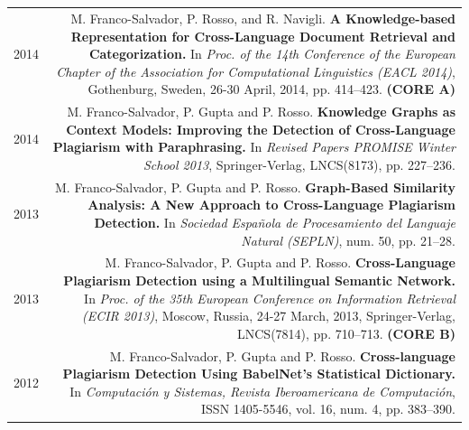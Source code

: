 \documentclass[10pt]{article}
\begin{document}
\section*{}
\begin{tabular}{L!{\VRule}R}
	2014&M. Franco-Salvador, P. Rosso, and R. Navigli. \textbf{A Knowledge-based Representation for Cross-Language Document Retrieval and Categorization.}
	In \emph{Proc. of the 14th Conference of the European Chapter of the Association for Computational Linguistics (EACL 2014)}, Gothenburg, Sweden, 26-30 April, 2014, pp. 414--423. \textbf{(CORE A)} \vspace{5pt}\\
	2014&M. Franco-Salvador, P. Gupta and P. Rosso. \textbf{Knowledge Graphs as Context Models: Improving the Detection of Cross-Language Plagiarism with Paraphrasing.}
	In \emph{Revised Papers PROMISE Winter School 2013}, Springer-Verlag, LNCS(8173), pp. 227--236.\vspace{5pt}\\
	2013&M. Franco-Salvador, P. Gupta and P. Rosso. \textbf{Graph-Based Similarity Analysis: A New Approach to Cross-Language Plagiarism Detection.}
	In \emph{Sociedad Espa{\~n}ola de Procesamiento del Languaje Natural (SEPLN)}, num. 50, pp. 21--28. \vspace{5pt}\\
	2013&M. Franco-Salvador, P. Gupta and P. Rosso. \textbf{Cross-Language Plagiarism Detection using a Multilingual Semantic Network.}
	In \emph{Proc. of the 35th European Conference on Information Retrieval (ECIR 2013)}, Moscow, Russia, 24-27 March, 2013, Springer-Verlag, LNCS(7814), pp. 710--713. \textbf{(CORE B)}\vspace{5pt}\\
	2012&M. Franco-Salvador, P. Gupta and P. Rosso. \textbf{Cross-language Plagiarism Detection Using BabelNet's Statistical Dictionary.}
	In \emph{Computaci{\'o}n y Sistemas, Revista Iberoamericana de Computaci{\'o}n}, ISSN 1405-5546, vol. 16, num. 4, pp. 383--390.\vspace{5pt}\\
\end{tabular}
\end{document}
